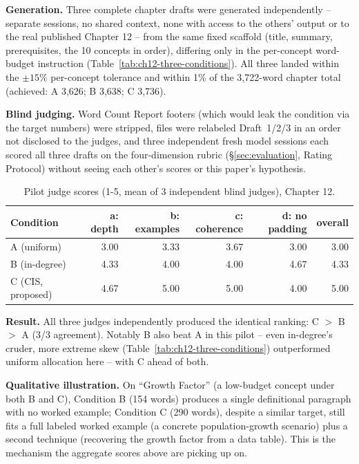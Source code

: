 \textbf{Generation.} Three complete chapter drafts were generated
independently -- separate sessions, no shared context, none with access to
the others' output or to the real published Chapter 12 -- from the same
fixed scaffold (title, summary, prerequisites, the 10 concepts in order),
differing only in the per-concept word-budget instruction
(Table~\ref{tab:ch12-three-conditions}). All three landed within the
$\pm15\%$ per-concept tolerance and within 1\% of the 3{,}722-word chapter
total (achieved: A 3{,}626; B 3{,}638; C 3{,}736).

\textbf{Blind judging.} Word Count Report footers (which would leak the
condition via the target numbers) were stripped, files were relabeled
Draft~1/2/3 in an order not disclosed to the judges, and three independent
fresh model sessions each scored all three drafts on the four-dimension
rubric (\S\ref{sec:evaluation}, Rating Protocol) without seeing each other's
scores or this paper's hypothesis.

\begin{table}[htbp]
\centering
\caption{Pilot judge scores (1-5, mean of 3 independent blind judges), Chapter 12.}
\label{tab:pilot-ch12-scores}
\begin{tabular}{lrrrrr}
\toprule
Condition & a: depth & b: examples & c: coherence & d: no padding & overall \\
\midrule
A (uniform)         & 3.00 & 3.33 & 3.67 & 3.00 & 3.00 \\
B (in-degree)        & 4.33 & 4.00 & 4.00 & 4.67 & 4.33 \\
C (CIS, proposed)    & 4.67 & 5.00 & 5.00 & 4.00 & 5.00 \\
\bottomrule
\end{tabular}
\end{table}

\textbf{Result.} All three judges independently produced the identical
ranking: C $>$ B $>$ A (3/3 agreement). Notably B also beat A in this pilot --
even in-degree's cruder, more extreme skew (Table~\ref{tab:ch12-three-conditions})
outperformed uniform allocation here -- with C ahead of both.

\textbf{Qualitative illustration.} On ``Growth Factor'' (a low-budget concept
under both B and C), Condition B (154 words) produces a single definitional
paragraph with no worked example; Condition C (290 words), despite a similar
target, still fits a full labeled worked example (a concrete population-growth
scenario) plus a second technique (recovering the growth factor from a data
table). This is the mechanism the aggregate scores above are picking up on.

